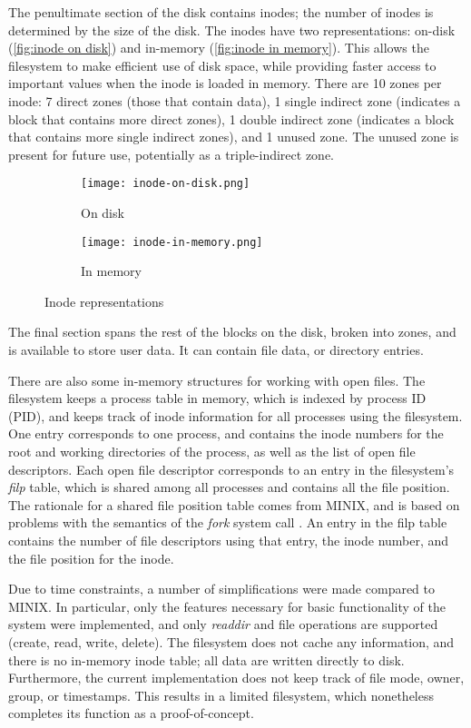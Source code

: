 The penultimate section of the disk contains inodes; the number of inodes is determined by the size of the disk.
The inodes have two representations: on-disk (\autoref{fig:inode on disk}) and in-memory (\autoref{fig:inode in memory}).
This allows the filesystem to make efficient use of disk space, while providing faster access to important values when the inode is loaded in memory.
There are 10 zones per inode: 7 direct zones (those that contain data), 1 single indirect zone (indicates a block that contains more direct zones), 1 double indirect zone (indicates a block that contains more single indirect zones), and 1 unused zone.
The unused zone is present for future use, potentially as a triple-indirect zone.

\begin{figure}[tb]
     \centering
     \begin{subfigure}[b]{0.45\textwidth}
         \centering
         \texttt{[image: inode-on-disk.png]}
         \caption{On disk}
         \label{fig:inode on disk}
     \end{subfigure}
     \begin{subfigure}[b]{0.45\textwidth}
         \centering
         \texttt{[image: inode-in-memory.png]}
         \caption{In memory}
         \label{fig:inode in memory}
     \end{subfigure}
     \caption{Inode representations}
     \label{fig:inode representations}
\end{figure}


The final section spans the rest of the blocks on the disk, broken into zones, and is available to store user data.
It can contain file data, or directory entries.

There are also some in-memory structures for working with open files.
The filesystem keeps a process table in memory, which is indexed by process ID (PID), and keeps track of inode information for all processes using the filesystem.
One entry corresponds to one process, and contains the inode numbers for the root and working directories of the process, as well as the list of open file descriptors.
Each open file descriptor corresponds to an entry in the filesystem's \textit{filp} table, which is shared among all processes and contains all the file position.
The rationale for a shared file position table comes from MINIX, and is based on problems with the semantics of the \textit{fork} system call \cite{tanenbaum1997}.
An entry in the filp table contains the number of file descriptors using that entry, the inode number, and the file position for the inode.

Due to time constraints, a number of simplifications were made compared to MINIX.
In particular, only the features necessary for basic functionality of the system were implemented, and only \textit{readdir} and file operations are supported (create, read, write, delete).
The filesystem does not cache any information, and there is no in-memory inode table; all data are written directly to disk.
Furthermore, the current implementation does not keep track of file mode, owner, group, or timestamps.
This results in a limited filesystem, which nonetheless completes its function as a proof-of-concept.
